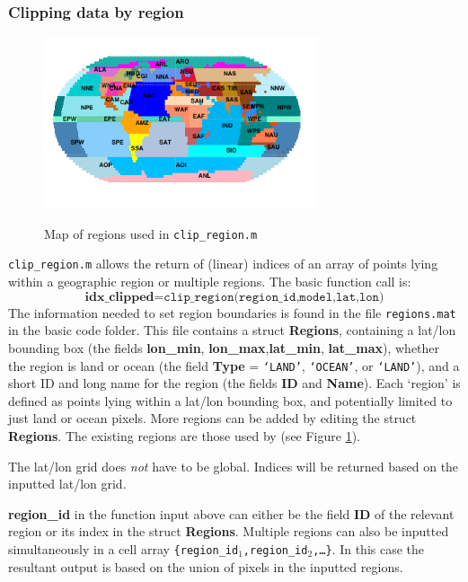 \documentclass{article}
\begin{document}
\subsubsection{Clipping data by region}
\begin{figure}[h] %
\centering
	\includegraphics[width=19pc,angle=0]{RegionsMap.pdf}\\
	\caption{Map of regions used in \texttt{clip\_region.m}}\label{fig:regions_map}
\end{figure}

\texttt{clip\_region.m} allows the return of (linear) indices of an array of points lying within a geographic region or multiple regions. The basic function call is:
\begin{equation}
\textbf{idx\_clipped} = \texttt{clip\_region(region\_id,model,lat,lon)}
\end{equation}
The information needed to set region boundaries is found in the file \texttt{regions.mat} in the basic code folder. This file contains a struct \textbf{Regions}, containing a lat/lon bounding box (the fields \textbf{lon\_min}, \textbf{lon\_max},\textbf{lat\_min}, \textbf{lat\_max}), whether the region is land or ocean (the field \textbf{Type} = \texttt{`LAND'}, \texttt{`OCEAN'}, or \texttt{`LAND'}), and a short ID and long name for the region (the fields \textbf{ID} and \textbf{Name}). Each `region' is defined as points lying within a lat/lon bounding box, and potentially limited to just land or ocean pixels. More regions can be added by editing the struct \textbf{Regions}. The existing regions are those used by \cite{castruccio_statistical_2013} (see Figure \ref{fig:regions_map}). 

The lat/lon grid does \textit{not} have to be global. Indices will be returned based on the inputted lat/lon grid.

\textbf{region\_id} in the function input above can either be the field \textbf{ID} of the relevant region or its index in the struct \textbf{Regions}. Multiple regions can also be inputted simultaneously in a cell array \texttt{\{region\_id$_1$,region\_id$_2$,\dots\}}. In this case the resultant output is based on the union of pixels in the inputted regions.  
\end{document}
